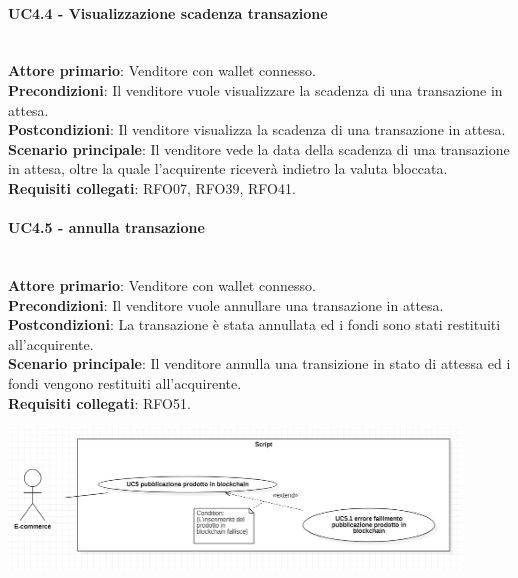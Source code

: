 \documentclass[a4paper, 12pt]{article}
\begin{document}
\paragraph{UC4.4 - Visualizzazione scadenza transazione}\\
\textbf{Attore primario}: Venditore  con wallet connesso.\\
\textbf{Precondizioni}: Il venditore vuole visualizzare la scadenza di una transazione in attesa.\\
\textbf{Postcondizioni}: Il venditore visualizza la scadenza di una transazione in attesa.\\
\textbf{Scenario principale}: Il venditore vede la data della scadenza di una transazione in attesa, oltre la quale l'acquirente riceverà indietro la valuta bloccata.\\
\textbf{Requisiti collegati}: RFO07, RFO39, RFO41.

\paragraph{UC4.5 - annulla transazione}\\
\textbf{Attore primario}: Venditore  con wallet connesso.\\
\textbf{Precondizioni}: Il venditore vuole annullare una transazione in attesa.\\
\textbf{Postcondizioni}: La transazione è stata annullata ed i fondi sono stati restituiti all'acquirente.\\
\textbf{Scenario principale}: Il venditore annulla una transizione in stato di attessa ed i fondi vengono restituiti all'acquirente.\\
\textbf{Requisiti collegati}: RFO51.

\includegraphics[width=0.9\textwidth]{UC_script}
\end{document}
